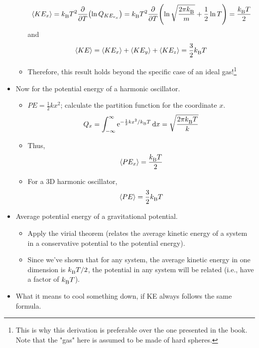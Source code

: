 \documentclass[../notes.tex]{subfiles}
\begin{document}
\begin{itemize}
\begin{itemize}
\begin{equation*}
            \prb{KE_x} = \kB T^2\pdv{T}(\ln Q_{KE_{v_x}})
            = \kB T^2\pdv{T}(\ln\sqrt{\frac{2\pi\kB}{m}}+\frac{1}{2}\ln T)
            = \frac{\kB T}{2}
        \end{equation*}
        and
        \begin{equation*}
            \prb{KE} = \prb{KE_x}+\prb{KE_y}+\prb{KE_z}
            = \frac{3}{2}\kB T
        \end{equation*}
        \item Therefore, this result holds beyond the specific case of an ideal gas!\footnote{This is why this derivation is preferable over the one presented in the book. Note that the "gas" here is assumed to be made of hard spheres.}
    \end{itemize}
    \item Now for the potential energy of a harmonic oscillator.
    \begin{itemize}
        \item $PE=\frac{1}{2}kx^2$; calculate the partition function for the coordinate $x$.
        \begin{equation*}
            Q_x = \int_{-\infty}^\infty\e[-\frac{1}{2}kx^2/\kB T]\dd{x}
            = \sqrt{\frac{2\pi \kB T}{k}}
        \end{equation*}
        \item Thus,
        \begin{equation*}
            \prb{PE_x} = \frac{\kB T}{2}
        \end{equation*}
        \item For a 3D harmonic oscillator,
        \begin{equation*}
            \prb{PE} = \frac{3}{2}\kB T
        \end{equation*}
    \end{itemize}
    \item Average potential energy of a gravitational potential.
    \begin{itemize}
        \item Apply the virial theorem (relates the average kinetic energy of a system in a conservative potential to the potential energy).
        \item Since we've shown that for any system, the average kinetic energy in one dimension is $\kB T/2$, the potential in any system will be related (i.e., have a factor of $\kB T$).
    \end{itemize}
    \item What it means to cool something down, if KE always follows the same formula.

\end{itemize}
\end{document}
